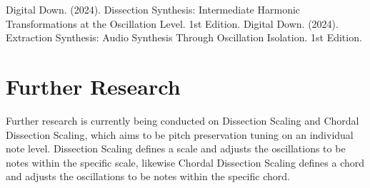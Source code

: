 \documentclass[12pt,a4paper]{article}
\begin{document}
\begin{thebibliography}{9}
 Digital Down. (2024). Dissection Synthesis: Intermediate Harmonic Transformations at the Oscillation Level. 1st Edition.
 Digital Down. (2024). Extraction Synthesis: Audio Synthesis Through Oscillation Isolation. 1st Edition.
\end{thebibliography}

\section*{Further Research}
Further research is currently being conducted on Dissection Scaling and Chordal Dissection Scaling, which aims to be pitch preservation tuning on an individual note level. Dissection Scaling defines a scale and adjusts the oscillations to be notes within the specific scale, likewise Chordal Dissection Scaling defines a chord and adjusts the oscillations to be notes within the specific chord.
\end{document}
